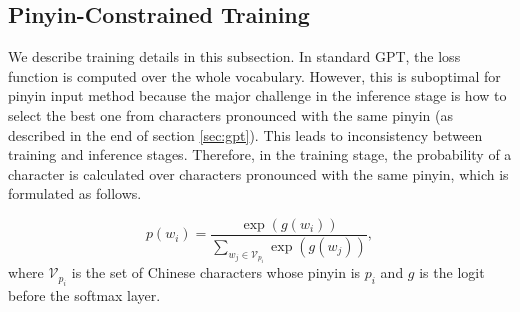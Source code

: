 



\subsection{Pinyin-Constrained Training}
\label{sec:training}
We describe training details in this subsection.
In standard GPT, the loss function is computed over the whole vocabulary.
However, this is suboptimal for pinyin input method because the major challenge in the inference stage is how to select the best one from characters pronounced with the same pinyin (as described in the end of section \ref{sec:gpt}).
This leads to inconsistency between training and inference stages.
Therefore, in the training stage, the probability of a character is calculated over characters pronounced with the same pinyin, which is formulated as follows.

\begin{equation}
    p(w_i) = \frac{\exp{(g(w_i))}}{\sum_{w_j\in \mathcal{V}_{p_i}}\exp{(g(w_j))}},
\end{equation}
where  $\mathcal{V}_{p_i}$ is the set of Chinese characters whose pinyin is $p_i$ and $g$ is the logit before the softmax layer.

